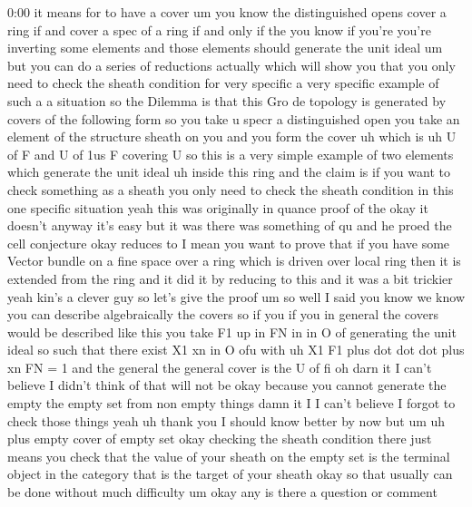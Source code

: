 \begin{unfinished}{0:00}
it  means  for  to  have  a  cover  um  you  know
the  distinguished  opens  cover  a  ring  if
and  cover  a  spec  of  a  ring  if  and  only
if  the  you  know  if  you're  you're
inverting  some  elements  and  those
elements  should  generate  the  unit  ideal
um  but  you  can  do  a  series  of  reductions
actually  which  will  show  you  that  you
only  need  to  check  the  sheath  condition
for  very  specific  a  very  specific
example  of  such  a  a  situation  so  the
Dilemma  is
that  this  Gro  de
topology  is
generated  by  covers  of  the  following
form  so  you
take  u
specr  a  distinguished
open  you  take  an  element  of  the
structure  sheath  on  you  and  you  form  the
cover  uh  which
is  uh  U  of  F  and  U  of  1us
F  covering
U  so  this  is  a  very  simple  example  of
two  elements  which  generate  the  unit
ideal  uh  inside  this  ring  and  the  claim
is  if  you  want  to  check  something  as  a
sheath  you  only  need  to  check  the  sheath
condition  in  this  one  specific
situation  yeah  this  was  originally  in
quance  proof  of  the  okay  it  doesn't
anyway  it's  easy  but  it  was  there  was
something  of  qu  and  he  proed  the  cell
conjecture
okay  reduces  to  I  mean  you  want  to  prove
that  if  you  have  some  Vector  bundle  on  a
fine  space  over  a  ring  which  is  driven
over  local  ring  then  it  is  extended  from
the  ring  and  it  did  it  by  reducing  to
this  and  it  was  a  bit  trickier  yeah
kin's  a  clever  guy  so  let's  give  the
proof
um  so
well  I  said  you  know  we  know  you  can
describe  algebraically  the  covers  so  if
you  if  you  in  general  the  covers  would
be  described  like  this  you  take  F1  up  in
FN  in  in  O  of  generating  the  unit  ideal
so  such  that  there  exist  X1  xn  in  O  ofu
with  uh  X1  F1  plus  dot  dot  dot  plus  xn
FN  =
1  and  the  general  the  general
cover  is  the  U
of
fi  oh  darn  it  I  can't  believe  I  didn't
think  of  that  will  not  be  okay  because
you  cannot  generate  the  empty  the  empty
set  from  non  empty  things  damn  it  I  I
can't  believe  I  forgot  to  check  those
things  yeah  uh  thank
you  I  should  know  better  by  now  but
um  uh  plus  empty
cover  of  empty
set  okay  checking  the  sheath  condition
there  just  means  you  check  that  the
value  of  your  sheath  on  the  empty  set  is
the  terminal  object  in  the  category  that
is  the  target  of  your  sheath  okay  so
that  usually  can  be  done  without  much
difficulty
um
okay  any  is  there  a  question  or  comment

\end{unfinished}
